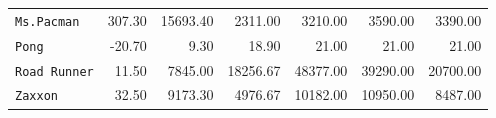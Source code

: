 \begin{table*}[ht]
{\begin{tabular}{l|r|r|r|r|r|r}
\texttt{Ms.Pacman} &307.30 & 15693.40 & 2311.00 & 3210.00 & \cellcolor{green!25}3590.00 & \cellcolor{yellow!25}3390.00\\
\texttt{Pong} &-20.70 &9.30 & 18.90 & 21.00 & \cellcolor{yellow!25}21.00 & \cellcolor{green!25}21.00\\
\texttt{Road Runner} &11.50 &7845.00 &18256.67  &\cellcolor{green!25}48377.00  &\cellcolor{yellow!25}39290.00  & 20700.00\\
\texttt{Zaxxon} &32.50 &9173.30 &4976.67  &\cellcolor{yellow!25}10182.00  &\cellcolor{green!25}10950.00  & 8487.00\\

\end{tabular}%
}
\label{tab:ch07_results}
\end{table*}
